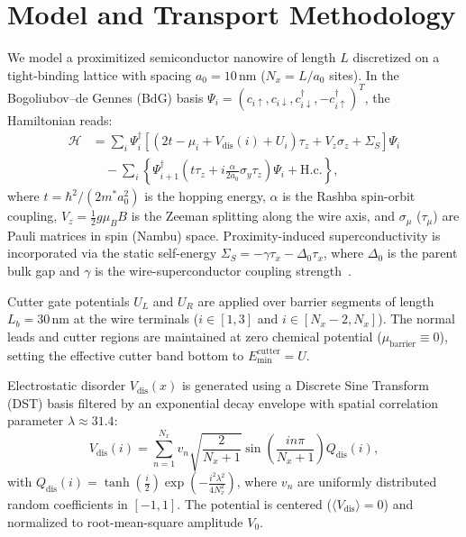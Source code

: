 \documentclass[aps,prb,reprint,superscriptaddress,amsmath,amssymb,floatfix]{revtex4-2}
\begin{document}
\section{Model and Transport Methodology}

We model a proximitized semiconductor nanowire of length $L$ discretized on a tight-binding lattice with spacing $a_0 = 10\,\text{nm}$ ($N_x = L / a_0$ sites). In the Bogoliubov--de Gennes (BdG) basis $\Psi_i = (c_{i\uparrow}, c_{i\downarrow}, c_{i\downarrow}^\dagger, -c_{i\uparrow}^\dagger)^T$, the Hamiltonian reads:
\begin{align}
\mathcal{H} &= \sum_{i} \Psi_i^\dagger \left[ (2t - \mu_i + V_{\mathrm{dis}}(i) + U_i) \tau_z + V_z \sigma_z + \Sigma_S \right] \Psi_i \nonumber \\
&\quad - \sum_{i} \left\{ \Psi_{i+1}^\dagger \left( t \tau_z + i \frac{\alpha}{2a_0} \sigma_y \tau_z \right) \Psi_i + \text{H.c.} \right\},
\end{align}
where $t = \hbar^2 / (2m^* a_0^2)$ is the hopping energy, $\alpha$ is the Rashba spin-orbit coupling, $V_z = \frac{1}{2} g \mu_B B$ is the Zeeman splitting along the wire axis, and $\sigma_\mu$ ($\tau_\mu$) are Pauli matrices in spin (Nambu) space. Proximity-induced superconductivity is incorporated via the static self-energy $\Sigma_S = -\gamma \tau_x - \Delta_0 \tau_x$, where $\Delta_0$ is the parent bulk gap and $\gamma$ is the wire-superconductor coupling strength~\cite{Stanescu2013}.

Cutter gate potentials $U_L$ and $U_R$ are applied over barrier segments of length $L_b = 30\,\text{nm}$ at the wire terminals ($i \in [1, 3]$ and $i \in [N_x-2, N_x]$). The normal leads and cutter regions are maintained at zero chemical potential ($\mu_{\mathrm{barrier}} \equiv 0$), setting the effective cutter band bottom to $E_{\mathrm{min}}^{\mathrm{cutter}} = U$.

Electrostatic disorder $V_{\mathrm{dis}}(x)$ is generated using a Discrete Sine Transform (DST) basis filtered by an exponential decay envelope with spatial correlation parameter $\lambda \approx 31.4$:
\begin{equation}
V_{\mathrm{dis}}(i) = \sum_{n=1}^{N_x} v_n \sqrt{\frac{2}{N_x+1}} \sin\left(\frac{i n \pi}{N_x+1}\right) Q_{\mathrm{dis}}(i),
\end{equation}
with $Q_{\mathrm{dis}}(i) = \tanh\left(\frac{i}{2}\right) \exp\left(-\frac{i^2 \lambda^2}{4 N_x^2}\right)$, where $v_n$ are uniformly distributed random coefficients in $[-1, 1]$. The potential is centered ($\langle V_{\mathrm{dis}} \rangle = 0$) and normalized to root-mean-square amplitude $V_0$.
\end{document}
